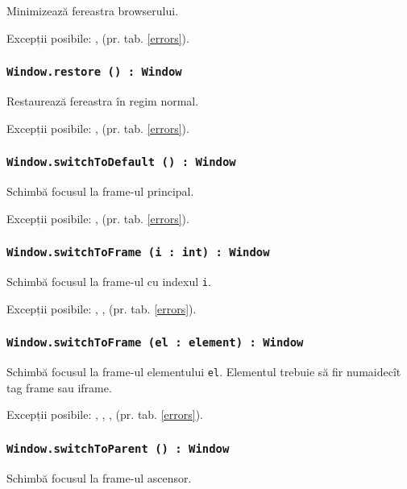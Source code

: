 Minimizează fereastra browserului.

Excepții posibile: ,  (pr. tab. \ref{errors}).

\subsubsection{\texttt{Window.restore () : Window}}

Restaurează fereastra în regim normal.

Excepții posibile: ,  (pr. tab. \ref{errors}).

\subsubsection{\texttt{Window.switchToDefault () : Window}}

Schimbă focusul la frame-ul principal.

Excepții posibile: ,  (pr. tab. \ref{errors}).

\subsubsection{\texttt{Window.switchToFrame (i : int) : Window}}

Schimbă focusul la frame-ul cu indexul \texttt{i}.

Excepții posibile: , ,  (pr. tab. \ref{errors}).

\subsubsection{\texttt{Window.switchToFrame (el : element) : Window}}

Schimbă focusul la frame-ul elementului \texttt{el}. Elementul trebuie să fir numaidecît tag frame sau iframe.

Excepții posibile: , , ,  (pr. tab. \ref{errors}).

\subsubsection{\texttt{Window.switchToParent () : Window}}

Schimbă focusul la frame-ul ascensor.

